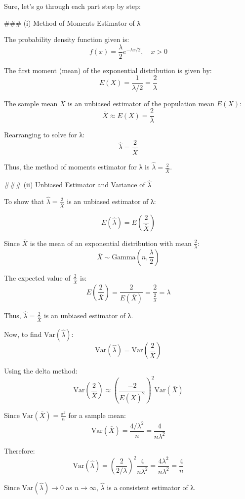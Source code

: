 \begin{enumerate}
Sure, let's go through each part step by step:

### (i) Method of Moments Estimator of λ

The probability density function given is:
\[ f(x) = \frac{\lambda}{2} e^{-\lambda x/2}, \quad x > 0 \]

The first moment (mean) of the exponential distribution is given by:
\[ E(X) = \frac{1}{\lambda/2} = \frac{2}{\lambda} \]

The sample mean \( \bar{X} \) is an unbiased estimator of the population mean \( E(X) \):
\[ \bar{X} \approx E(X) = \frac{2}{\lambda} \]

Rearranging to solve for λ:
\[ \hat{\lambda} = \frac{2}{\bar{X}} \]

Thus, the method of moments estimator for λ is \( \hat{\lambda} = \frac{2}{\bar{X}} \).

### (ii) Unbiased Estimator and Variance of \( \hat{\lambda} \)

To show that \( \hat{\lambda} = \frac{2}{\bar{X}} \) is an unbiased estimator of λ:

\[ E(\hat{\lambda}) = E\left(\frac{2}{\bar{X}}\right) \]

Since \( \bar{X} \) is the mean of an exponential distribution with mean \( \frac{2}{\lambda} \):
\[ \bar{X} \sim \text{Gamma}(n, \frac{\lambda}{2}) \]

The expected value of \( \frac{2}{\bar{X}} \) is:
\[ E\left(\frac{2}{\bar{X}}\right) = \frac{2}{E(\bar{X})} = \frac{2}{\frac{2}{\lambda}} = \lambda \]

Thus, \( \hat{\lambda} = \frac{2}{\bar{X}} \) is an unbiased estimator of λ.

Now, to find \( \text{Var}(\hat{\lambda}) \):
\[ \text{Var}(\hat{\lambda}) = \text{Var}\left(\frac{2}{\bar{X}}\right) \]

Using the delta method:
\[ \text{Var}\left(\frac{2}{\bar{X}}\right) \approx \left( \frac{-2}{E(\bar{X})^2} \right)^2 \text{Var}(\bar{X}) \]

Since \( \text{Var}(\bar{X}) = \frac{\sigma^2}{n} \) for a sample mean:
\[ \text{Var}(\bar{X}) = \frac{4/\lambda^2}{n} = \frac{4}{n\lambda^2} \]

Therefore:
\[ \text{Var}(\hat{\lambda}) = \left( \frac{2}{2/\lambda} \right)^2 \frac{4}{n\lambda^2} = \frac{4\lambda^2}{n\lambda^2} = \frac{4}{n} \]

Since \( \text{Var}(\hat{\lambda}) \to 0 \) as \( n \to \infty \), \( \hat{\lambda} \) is a consistent estimator of λ.


\end{enumerate}
